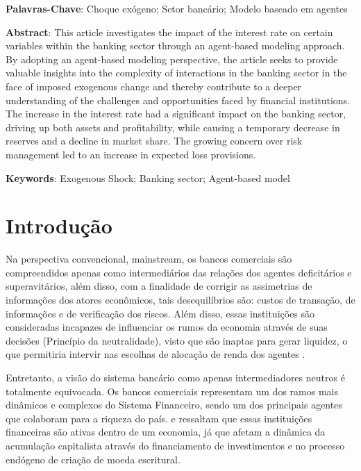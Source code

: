 \documentclass[hidelinks, article,12pt,oneside,a4paper,english,brazil,sumario=tradicional]{abntex2}
\begin{document}
\vspace{2mm}

\noindent \textbf{Palavras-Chave}: Choque exógeno; Setor bancário; Modelo baseado em agentes

\vspace{2.5mm}

\noindent \textbf{Abstract}: This article investigates the impact of the interest rate on certain variables within the banking sector through an agent-based modeling approach. By adopting an agent-based modeling perspective, the article seeks to provide valuable insights into the complexity of interactions in the banking sector in the face of imposed exogenous change and thereby contribute to a deeper understanding of the challenges and opportunities faced by financial institutions. The increase in the interest rate had a significant impact on the banking sector, driving up both assets and profitability, while causing a temporary decrease in reserves and a decline in market share. The growing concern over risk management led to an increase in expected loss provisions.

\vspace{2mm}

\noindent \textbf{Keywords}: Exogenous Shock; Banking sector; Agent-based model



\section{Introdução}
\label{secIntroducao}
\normalsize

Na perspectiva convencional, mainstream, os bancos comerciais são compreendidos apenas como intermediários das relações dos agentes deficitários e superavitários, além disso, com a finalidade de corrigir as assimetrias de informações dos atores econômicos, tais desequilíbrios são: custos de transação, de informações e de verificação dos riscos. Além disso, essas instituições são consideradas incapazes de influenciar os rumos da economia através de suas decisões (Princípio da neutralidade), visto que são inaptas para gerar liquidez, o que permitiria intervir nas escolhas de alocação de renda dos agentes \cite{paula2013financiamento}.

Entretanto, a visão do sistema bancário como apenas intermediadores neutros é totalmente equivocada. Os bancos comerciais representam um dos ramos mais dinâmicos e complexos do Sistema Financeiro, sendo um dos principais agentes que colaboram para a riqueza do país.   e  ressaltam que essas instituições financeiras são ativas dentro de um economia, já que afetam a dinâmica da acumulação capitalista através do financiamento de investimentos e no processo endógeno de criação de moeda escritural.
\end{document}
